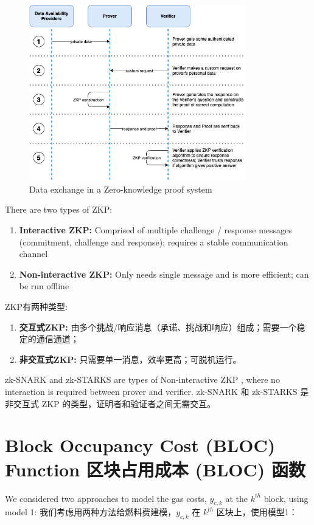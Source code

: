 \documentclass{ctexart}
\begin{document}
\begin{figure}[h!]
\centering
\includegraphics[width=3.7in]{img/zkp.png}
\caption{Data exchange in a Zero-knowledge proof system} 
\label{fig:zkp}
\end{figure} 

There are two types of ZKP:
\begin{enumerate}
\item \textbf{Interactive ZKP:} Comprised of multiple challenge / response messages (commitment, challenge and response); requires a stable communication channel
\item \textbf{Non-interactive ZKP:} Only needs single message and is more efficient; can be run offline
\end{enumerate}

ZKP有两种类型:
\begin{enumerate}
\item \textbf{交互式ZKP:} 由多个挑战/响应消息（承诺、挑战和响应）组成；需要一个稳定的通信通道；
\item \textbf{非交互式ZKP:} 只需要单一消息，效率更高；可脱机运行。
\end{enumerate}

zk-SNARK and zk-STARKS are types of Non-interactive ZKP , where no interaction is required between prover and verifier. zk-SNARK 和 zk-STARKS 是非交互式 ZKP 的类型，证明者和验证者之间无需交互。

\section{Block Occupancy Cost (BLOC) Function 区块占用成本 (BLOC) 函数}

We considered two approaches to model the gas costs, $y_{c,k}$ at the $k^{th}$ block, using model 1:
我们考虑用两种方法给燃料费建模，$y_{c,k}$ 在 $k^{th}$ 区块上，使用模型1：
\end{document}
